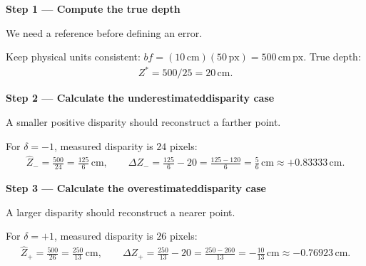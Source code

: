 \documentclass[letterpaper,11pt,english,openany,oneside]{jupyterBook}
\begin{document}
\par\medskip{}
{\color{QuizStepRed}\bfseries Step 1 — Compute the true depth}\par\smallskip

\sphinxAtStartPar
{} We need a reference before defining an error.

\sphinxAtStartPar
Keep physical units consistent: {\color{QuizMathBlue} \(bf=(10\,\mathrm{cm})(50\,\mathrm{px})=500\,\mathrm{cm\,px}\)}. True depth:
{\color{QuizMathBlue} \begin{equation*}
\begin{split}
Z^*=500/25=\boxed{20\,\mathrm{cm}}.
\end{split}
\end{equation*}}
\par

\par\medskip{}
{\color{QuizStepRed}\bfseries Step 2 — Calculate the underestimated\sphinxhyphen{}disparity case}\par\smallskip

\sphinxAtStartPar
{} A smaller positive disparity should reconstruct a farther point.

\sphinxAtStartPar
For {\color{QuizMathBlue} \(\delta=-1\)}, measured disparity is {\color{QuizMathBlue} \(24\)} pixels:
{\color{QuizMathBlue} \begin{equation*}
\begin{split}
\widehat Z_- =\frac{500}{24}=\frac{125}{6}\,\mathrm{cm},\qquad
\Delta Z_- =\frac{125}{6}-20=\frac{125-120}{6}=\frac56\,\mathrm{cm}\approx+0.83333\,\mathrm{cm}.
\end{split}
\end{equation*}}
\par

\par\medskip{}
{\color{QuizStepRed}\bfseries Step 3 — Calculate the overestimated\sphinxhyphen{}disparity case}\par\smallskip

\sphinxAtStartPar
{} A larger disparity should reconstruct a nearer point.

\sphinxAtStartPar
For {\color{QuizMathBlue} \(\delta=+1\)}, measured disparity is {\color{QuizMathBlue} \(26\)} pixels:
{\color{QuizMathBlue} \begin{equation*}
\begin{split}
\widehat Z_+ =\frac{500}{26}=\frac{250}{13}\,\mathrm{cm},\qquad
\Delta Z_+ =\frac{250}{13}-20=\frac{250-260}{13}=-\frac{10}{13}\,\mathrm{cm}\approx-0.76923\,\mathrm{cm}.
\end{split}
\end{equation*}}
\par
\end{document}
